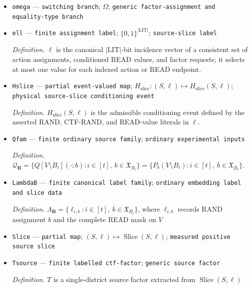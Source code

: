 \documentclass{article}
\begin{document}
\begin{itemize}
  \par\smallskip\noindent\emph{Definition.} \(\Omega=\bigsqcup_{j=1}^{k}\{j\}\times\Omega_j\), where \(\Omega_j\) contains every complete assignment of the free transformed-ancestry request positions of \(C_j\), paired with its induced equality type.
  \item \texttt{omega} --- \texttt{switching branch}; \(\Omega\); \texttt{generic factor-\allowbreak{}assignment and equality-\allowbreak{}type branch}
  \item \texttt{ell} --- \texttt{finite assignment label}; \(\{0,1\}^{|\mathrm{LIT}|}\); \texttt{source-\allowbreak{}slice label}
  \par\smallskip\noindent\emph{Definition.} \(\ell\) is the canonical \( |\mathrm{LIT}|\)-bit incidence vector of a consistent set of action assignments, conditioned READ values, and factor requests; it selects at most one value for each indexed action or READ endpoint.
  \item \texttt{Hslice} --- \texttt{partial event-\allowbreak{}valued map}; \(H_{\mathrm{slice}}:(S,\ell)\mapsto H_{\mathrm{slice}}(S,\ell)\); \texttt{physical source-\allowbreak{}slice conditioning event}
  \par\smallskip\noindent\emph{Definition.} \(H_{\mathrm{slice}}(S,\ell)\) is the admissible conditioning event defined by the asserted RAND, CTF-RAND, and READ-value literals in \(\ell\).
  \item \texttt{Qfam} --- \texttt{finite ordinary source family}; \texttt{ordinary experimental inputs}
  \par\smallskip\noindent\emph{Definition.} \(\mathcal Q_{\mathbf B}=\{Q[V\setminus B_i](\cdot;b):i\in[t],\ b\in\mathfrak X_{B_i}\}=\{P_b(V\setminus B_i):i\in[t],\ b\in\mathfrak X_{B_i}\}\).
  \item \texttt{LambdaB} --- \texttt{finite canonical label family}; \texttt{ordinary embedding label and slice data}
  \par\smallskip\noindent\emph{Definition.} \(\Lambda_{\mathbf B}=\{\ell_{i,b}:i\in[t],\ b\in\mathfrak X_{B_i}\}\), where \(\ell_{i,b}\) records RAND assignment \(b\) and the complete READ mask on \(V\)
  \item \texttt{Slice} --- \texttt{partial map}; \((S,\ell)\mapsto\operatorname{Slice}(S,\ell)\); \texttt{measured positive source slice}
  \item \texttt{Tsource} --- \texttt{finite labelled ctf-\allowbreak{}factor}; \texttt{generic source factor}
  \par\smallskip\noindent\emph{Definition.} \(T\) is a single-district source factor extracted from \(\operatorname{Slice}(S,\ell)\)

\end{itemize}
\end{document}
